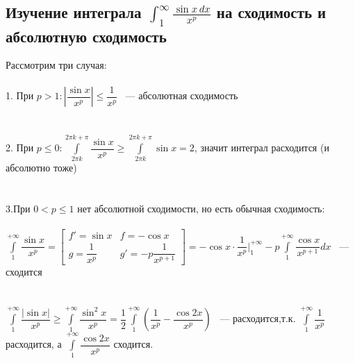 \documentclass[../main.tex]{subfiles}
\begin{document}
\subsection{Изучение интеграла $\int_1^{\infty} \frac{\sin x\,dx}{x^p}$ на сходимость и абсолютную сходимость}
Рассмотрим три случая:\\\\
1. При $p > 1 : \left| \dfrac{\sin{x}}{x^p} \right| \leq \dfrac{1}{x^p}$ ~--- абсолютная сходимость\\\\\\
2. При $p \leq 0 : \int\limits^{2 \pi k + \pi}_{2 \pi k} \dfrac{\sin{x}}{x^p} \geq \int\limits^{2 \pi k + \pi}_{2 \pi k} \sin{x} = 2$, значит интеграл расходится (и абсолютно тоже)\\\\\\
3.При $0 < p \leq 1$ нет абсолютной сходимости, но есть обычная сходимость:\\\\
$\int\limits^{+\infty}_1 \dfrac{\sin{x}}{x^p} = \begin{bmatrix} f' = \sin x & f = -\cos x \\ g = \dfrac{1}{x^p} & g' = -p \dfrac{1}{x^{p + 1}} \end{bmatrix} = - \cos{x} \cdot \dfrac{1}{x^p} \bigg|^{+\infty}_1 - p \int\limits^{+\infty}_1 \dfrac{\cos{x}}{x^{p + 1}} dx$ ~--- сходится\\\\\\
$\int\limits^{+\infty}_1 \dfrac{|\sin{x}|}{x^p} \geq \int\limits^{+\infty}_1 \dfrac{\sin^2 x}{x^p} = \dfrac{1}{2} \int\limits^{+\infty}_1 \left( \dfrac{1}{x^p} - \dfrac{\cos{2x}}{x^p} \right)$ ~--- расходится,т.к. $\int\limits^{+\infty}_1 \dfrac{1}{x^p}$ расходится, а $\int\limits^{+\infty}_1 \dfrac{\cos{2x}}{x^p}$ сходится.

\newpage
\end{document}
